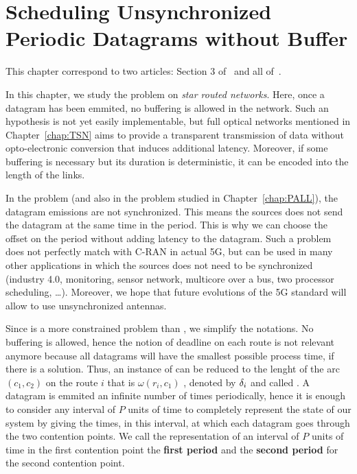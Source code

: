 
\chapter{Scheduling Unsynchronized Periodic Datagrams without Buffer}
\label{chap:PAZL}
\minitoc


This chapter correspond to two articles: Section $3$ of~\cite{DBLP:conf/ict/BarthGLMS18} and all of~\cite{DBLP:journals/corr/abs-2002-07606}.


 In this chapter, we study the problem \pazl on \emph{star routed networks}. Here, once a datagram has been emmited, no buffering is allowed in the network. Such an hypothesis is not yet easily implementable, but full optical networks mentioned in Chapter~\ref{chap:TSN} aims to provide a transparent transmission of data without opto-electronic conversion that induces additional latency. 
 Moreover, if some buffering is necessary but its duration is deterministic, it can be encoded into the length of the links.

 In the problem \pazl (and also in the problem \pall studied in Chapter~\ref{chap:PALL}), the datagram emissions are not synchronized. This means the sources does not send the datagram at the same time in the period. This is why we can choose the offset on the period without adding latency to the datagram. Such a problem does not perfectly match with C-RAN in actual 5G, but can be used in many other applications in which the sources does not need to be synchronized (industry 4.0, monitoring, sensor network, multicore over a bus, two processor scheduling, \dots).  Moreover, we hope that future evolutions of the 5G standard will allow to use unsynchronized antennas.

 Since \pazl is a more constrained problem than \pall, we simplify the notations. No buffering is allowed, hence the notion of deadline on each route is not relevant anymore because all datagrams will have the smallest possible process time, if there is a solution. Thus, an instance of \pazl can be reduced to the lenght of the arc $(c_1,c_2)$ on the route $i$ that is $\omega(r_i,c_1)$ , denoted by $\delta_i$ and called \nomdelay. A datagram is emmited an infinite number of times periodically, hence it is enough to consider any interval of $P$ units of time to completely represent the state of our system by giving the times, in this interval, at which each datagram goes through the two contention points. We call the representation of an interval of $P$ units of time in the first contention point the \textbf{first period} and the \textbf{second period} for the second contention point. 

